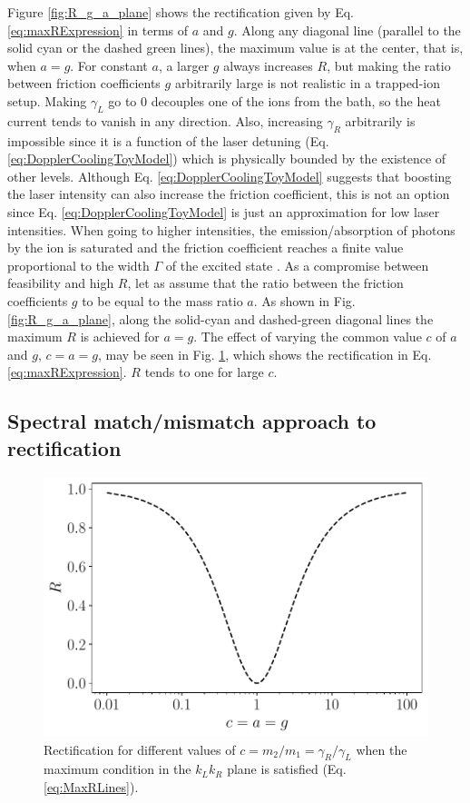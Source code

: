 Figure \ref{fig:R_g_a_plane} shows the rectification given by Eq. \eqref{eq:maxRExpression} in terms of $a$ and $g$. Along any diagonal line (parallel to the solid cyan or the dashed green lines), the maximum value is at the center, that is, when $a = g$. For constant $a$, a larger $g$ always increases $R$, but making the  ratio between friction coefficients $g$ arbitrarily large is not  realistic in a trapped-ion setup.
Making $\gamma_L$ go to 0 decouples one of the ions from the bath, so the heat current tends to vanish in any direction. Also, increasing $\gamma_R$ arbitrarily is impossible since it is a function of the laser detuning (Eq. \eqref{eq:DopplerCoolingToyModel}) which is physically bounded
by the existence of other levels. Although Eq. \eqref{eq:DopplerCoolingToyModel} suggests that boosting the laser intensity can also increase the friction coefficient, this is not an option since Eq. \eqref{eq:DopplerCoolingToyModel} is just an approximation for low laser intensities. When going to higher intensities, the emission/absorption of photons by the ion is saturated and the friction coefficient reaches a finite value proportional to the width $\Gamma$ of the excited state \cite{Metcalf2003}. As a compromise between feasibility and high $R$, let as assume that the ratio between the friction coefficients $g$ to be equal to the mass ratio $a$. As shown  in Fig. \ref{fig:R_g_a_plane}, along the solid-cyan and dashed-green diagonal lines the maximum $R$ is achieved for $a = g$. The effect of varying  the common value $c$ of $a$ and $g$, $c=a = g$, may be seen in
Fig. \ref{fig:Fig_PerfectRectification}, which  shows the rectification in Eq. \eqref{eq:maxRExpression}. $R$ tends to one for large $c$.
%
%
\subsection{Spectral match/mismatch approach to rectification}
%
%
%
\begin{figure}
  \center
  \includegraphics[width=\linewidth]{Figures/CC.pdf}
  \caption{Rectification for different values of $c=m_2/m_1=\gamma_R/\gamma_L$ when the maximum condition in the $k_L k_R$ plane is satisfied (Eq. \eqref{eq:MaxRLines}).}
  \label{fig:Fig_PerfectRectification}
\end{figure}

